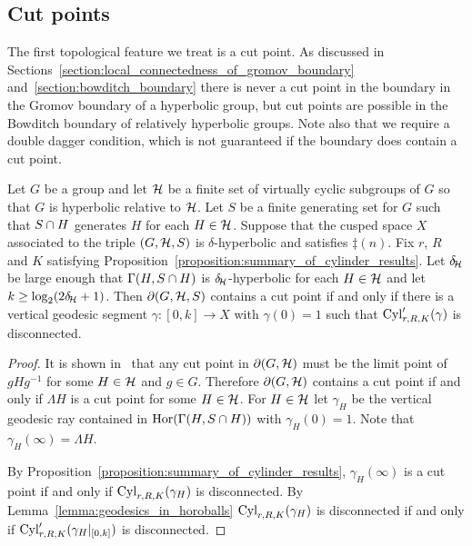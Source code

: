 \subsection{Cut points}

The first topological feature we treat is a cut point. 
As discussed in Sections~\ref{section:local_connectedness_of_gromov_boundary} and~\ref{section:bowditch_boundary} there is never a cut point in the boundary in the Gromov boundary of a hyperbolic group, but cut points are possible in the Bowditch boundary of relatively hyperbolic groups.
Note also that we require a double dagger condition, which is not guaranteed if the boundary does contain a cut point.

\begin{proposition}\label{proposition:cut_point_feature} 
  Let $G$ be a group and let $\mathcal{H}$ be a finite set of virtually cyclic subgroups of $G$ so that $G$ is hyperbolic relative to $\mathcal{H}$.
  Let $S$ be a finite generating set for $G$ such that $S \cap H$ generates $H$ for each $H \in \mathcal{H}$.
  Suppose that the cusped space $X$ associated to the triple $(G, \mathcal{H}, S)$ is $\delta$-hyperbolic and satisfies $\ddag(n)$.
  Fix $r$, $R$ and $K$ satisfying Proposition~\ref{proposition:summary_of_cylinder_results}.
  Let $\delta\kern-2pt_{\mathcal{H}}$ be large enough that $\operatorname{\Gamma}(H,S\cap H)$ is $\delta\kern-2pt_{\mathcal{H}}$-hyperbolic for each $H \in \mathcal{H}$ and let $k \geq \log_2(2\delta\kern-2pt_{\mathcal{H}} + 1)$.
  Then $\partial(G, \mathcal{H}, S)$ contains a cut point if and only if there is a vertical geodesic segment $\gamma \colon [0, k] \to X$ with $\gamma(0) = 1$ such that $\operatorname{Cyl}'_{r, R, K}(\gamma)$ is disconnected.
\end{proposition}
  
\begin{proof} 
  It is shown in~\cite[Theorem 0.2]{bowditch99a} that any cut point in $\partial(G, \mathcal{H})$ must be the limit point of $gHg^{-1}$ for some $H \in \mathcal{H}$ and $g \in G$. 
  Therefore $\partial(G, \mathcal{H})$ contains a cut point if and only if $\Lambda H$ is a cut point for some $H \in \mathcal{H}$.  
  For $H \in \mathcal{H}$ let $\gamma_H$ be the vertical geodesic ray contained in $\operatorname{Hor}(\operatorname{\Gamma}(H, S \cap H))$ with $\gamma_H(0)=1$.
  Note that $\gamma_H(\infty) = \Lambda H$.

  By Proposition~\ref{proposition:summary_of_cylinder_results}, $\gamma_H(\infty)$ is a cut point if and only if $\operatorname{Cyl}_{r, R, K}(\gamma_H)$ is disconnected.
  By Lemma~\ref{lemma:geodesics_in_horoballs} $\operatorname{Cyl}_{r, R, K}(\gamma_H)$ is disconnected if and only if $\operatorname{Cyl}_{r, R, K}'(\gamma_H\vert_{[0,k]})$ is disconnected.
\end{proof}

